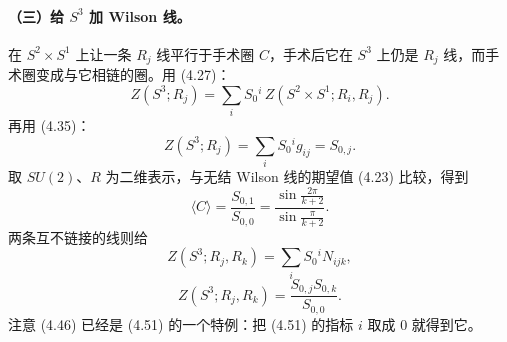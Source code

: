 \paragraph{（三）给 $S^3$ 加 Wilson 线。}
在 $S^2\times S^1$ 上让一条 $R_j$ 线平行于手术圈 $C$，手术后它在 $S^3$ 上仍是 $R_j$ 线，而手术圈变成与它相链的圈。用 (4.27)：
\begin{equation}
Z(S^3;R_j)=\sum_i S_0{}^i\,Z(S^2\times S^1;R_i,R_j). \tag{4.42}
\end{equation}
再用 (4.35)：
\begin{equation}
Z(S^3;R_j)=\sum_i S_0{}^i g_{ij}=S_{0,j}. \tag{4.43}
\end{equation}
取 $SU(2)$、$R$ 为二维表示，与无结 Wilson 线的期望值 (4.23) 比较，得到
\begin{equation}
\langle C\rangle=\frac{S_{0,1}}{S_{0,0}}
=\frac{\sin\frac{2\pi}{k+2}}{\sin\frac{\pi}{k+2}}. \tag{4.44}
\end{equation}
两条互不链接的线则给
\begin{equation}
Z(S^3;R_j,R_k)=\sum_i S_0{}^i N_{ijk}, \tag{4.45}
\end{equation}
\begin{equation}
Z(S^3;R_j,R_k)=\frac{S_{0,j}S_{0,k}}{S_{0,0}}. \tag{4.46}
\end{equation}
注意 (4.46) 已经是 (4.51) 的一个特例：把 (4.51) 的指标 $i$ 取成 $0$ 就得到它。

